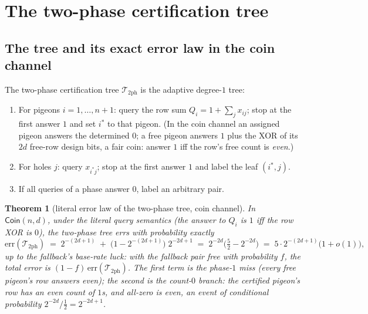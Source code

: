 \documentclass[11pt]{article}
\newtheorem{theorem}{Theorem}[section]
\theoremstyle{definition}
\theoremstyle{remark}
\begin{document}
\section{The two-phase certification tree}\label{sec:twophase}

\subsection{The tree and its exact error law in the coin channel}

The two-phase certification tree $\mathcal{T}_{2\mathrm{ph}}$ is the
adaptive degree-$1$ tree:
\begin{enumerate}
\item[Phase 1.] For pigeons $i=1,\dots,n+1$: query the row sum
$Q_i=1+\sum_jx_{ij}$; stop at the first answer $1$ and set $i^{\ast}$ to
that pigeon.  (In the coin channel an assigned pigeon answers the
determined $0$; a free pigeon answers $1$ plus the XOR of its $2d$
free-row design bits, a fair coin: answer $1$ iff the row's free count
is \emph{even}.)
\item[Phase 2.] For holes $j$: query $x_{i^{\ast}j}$; stop at the first
answer $1$ and label the leaf $(i^{\ast},j)$.
\item[Fallback.] If all queries of a phase answer $0$, label an
arbitrary pair.
\end{enumerate}

\begin{theorem}[literal error law of the two-phase tree, coin channel]
\label{thm:twophase}
In $\mathsf{Coin}(n,d)$, under the literal query semantics (the answer
to $Q_i$ is $1$ iff the row XOR is $0$), the two-phase tree errs with
probability exactly
\[
\mathrm{err}(\mathcal{T}_{2\mathrm{ph}})
\;=\;2^{-(2d+1)}\;+\;\bigl(1-2^{-(2d+1)}\bigr)\;2^{-2d+1}
\;=\;2^{-2d}\bigl(\tfrac52-2^{-2d}\bigr)
\;=\;5\cdot 2^{-(2d+1)}\bigl(1+o(1)\bigr),
\]
up to the fallback's base-rate luck: with the fallback pair free with
probability $f$, the total error is
$(1-f)\,\mathrm{err}(\mathcal{T}_{2\mathrm{ph}})$.  The first term is
the phase-$1$ miss (every free pigeon's row answers even); the second
is the \emph{count-$0$ branch}: the certified pigeon's row has an even
count of $1$s, and all-zero is even, an event of conditional
probability $2^{-2d}/\tfrac12=2^{-2d+1}$.
\end{theorem}
\end{document}
